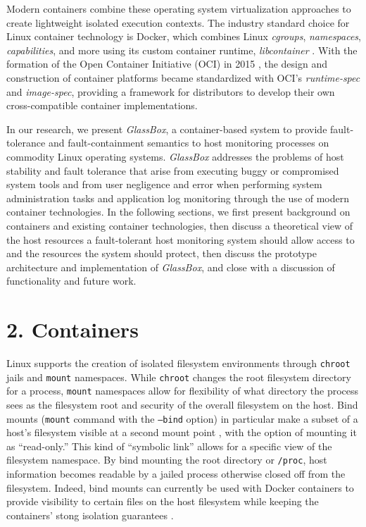 \documentclass{proc}
\begin{document}
Modern containers combine these operating system virtualization approaches to create lightweight isolated execution contexts. The industry standard choice for Linux container technology is Docker, which combines Linux \textit{cgroups}, \textit{namespaces}, \textit{capabilities}, and more using its custom container runtime, \textit{libcontainer} \cite{hykes2014libcontainer}. With the formation of the Open Container Initiative (OCI) in 2015 \cite{opencontainerinitiative}, the design and construction of container platforms became standardized with OCI's \textit{runtime-spec} and \textit{image-spec}, providing a framework for distributors to develop their own cross-compatible container implementations.

In our research, we present \textit{GlassBox}, a container-based system to provide fault-tolerance and fault-containment semantics to host monitoring processes on commodity Linux operating systems. \textit{GlassBox} addresses the problems of host stability and fault tolerance that arise from executing buggy or compromised system tools and from user negligence and error when performing system administration tasks and application log monitoring through the use of modern container technologies. In the following sections, we first present background on containers and existing container technologies, then discuss a theoretical view of the host resources a fault-tolerant host monitoring system should allow access to and the resources the system should protect, then discuss the prototype architecture and implementation of \textit{GlassBox}, and close with a discussion of functionality and future work.

\section*{2. Containers}

Linux supports the creation of isolated filesystem environments through \texttt{chroot} jails and \texttt{mount} namespaces. While \texttt{chroot} changes the root filesystem directory for a process, \texttt{mount} namespaces allow for flexibility of what directory the process sees as the filesystem root and security of the overall filesystem on the host. Bind mounts (\texttt{mount} command with the \texttt{--bind} option) in particular make a subset of a host's filesystem visible at a second mount point \cite{bindmount}, with the option of mounting it as ``read-only.'' This kind of ``symbolic link'' allows for a specific view of the filesystem namespace. By bind mounting the root directory or \texttt{/proc}, host information becomes readable by a jailed process otherwise closed off from the filesystem. Indeed, bind mounts can currently be used with Docker containers to provide visibility to certain files on the host filesystem while keeping the containers' stong isolation guarantees \cite{dockerdoc}.
\end{document}
